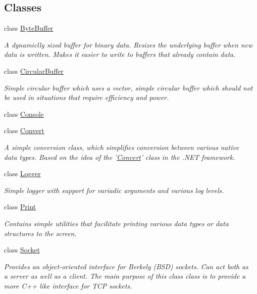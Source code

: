 \subsection*{Classes}
\begin{DoxyCompactItemize}
\item 
class \hyperlink{class_senergy_1_1_byte_buffer}{Byte\-Buffer}
\begin{DoxyCompactList}\small\item\em A dynamiclly sized buffer for binary data. Resizes the underlying buffer when new data is written. Makes it easier to write to buffers that already contain data. \end{DoxyCompactList}\item 
class \hyperlink{class_senergy_1_1_circular_buffer}{Circular\-Buffer}
\begin{DoxyCompactList}\small\item\em Simple circular buffer which uses a vector, simple circular buffer which should not be used in situations that require efficiency and power. \end{DoxyCompactList}\item 
class \hyperlink{class_senergy_1_1_console}{Console}
\item 
class \hyperlink{class_senergy_1_1_convert}{Convert}
\begin{DoxyCompactList}\small\item\em A simple conversion class, which simplifies conversion between various native data types. Based on the idea of the '\hyperlink{class_senergy_1_1_convert}{Convert}' class in the .N\-E\-T framework. \end{DoxyCompactList}\item 
class \hyperlink{class_senergy_1_1_logger}{Logger}
\begin{DoxyCompactList}\small\item\em Simple logger with support for variadic arguments and various log levels. \end{DoxyCompactList}\item 
class \hyperlink{class_senergy_1_1_print}{Print}
\begin{DoxyCompactList}\small\item\em Contains simple utilities that facilitate printing various data types or data structures to the screen. \end{DoxyCompactList}\item 
class \hyperlink{class_senergy_1_1_socket}{Socket}
\begin{DoxyCompactList}\small\item\em Provides an object-\/oriented interface for Berkely (B\-S\-D) sockets. Can act both as a server as well as a client. The main purpose of this class class is to provide a more C++ like interface for T\-C\-P sockets. \end{DoxyCompactList}\item 

\end{DoxyCompactItemize}
